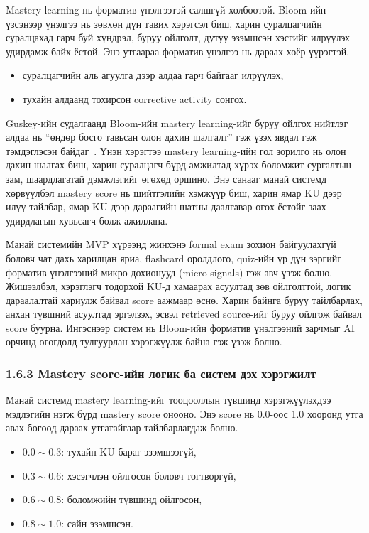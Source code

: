 \documentclass[12pt,A4]{report}
\newcommand{\eng}[1]{#1}
\begin{document}
Mastery learning нь форматив үнэлгээтэй салшгүй холбоотой. Bloom-ийн үзсэнээр үнэлгээ нь зөвхөн дүн тавих хэрэгсэл биш, харин суралцагчийн суралцахад гарч буй хүндрэл, буруу ойлголт, дутуу эзэмшсэн хэсгийг илрүүлэх удирдамж байх ёстой. Энэ утгаараа форматив үнэлгээ нь дараах хоёр үүрэгтэй.

\begin{itemize}
    \item суралцагчийн аль агуулга дээр алдаа гарч байгааг илрүүлэх,
    \item тухайн алдаанд тохирсон corrective activity сонгох.
\end{itemize}

Guskey-ийн судалгаанд Bloom-ийн mastery learning-ийг буруу ойлгох нийтлэг алдаа нь ``өндөр босго тавьсан олон дахин шалгалт'' гэж үзэх явдал гэж тэмдэглэсэн байдаг~\cite{guskey2007}. Үнэн хэрэгтээ mastery learning-ийн гол зорилго нь олон дахин шалгах биш, харин суралцагч бүрд амжилтад хүрэх боломжит сургалтын зам, шаардлагатай дэмжлэгийг өгөхөд оршино. Энэ санааг манай системд хөрвүүлбэл mastery score нь шийтгэлийн хэмжүүр биш, харин ямар KU дээр илүү тайлбар, ямар KU дээр дараагийн шатны даалгавар өгөх ёстойг заах удирдлагын хувьсагч болж ажиллана.

Манай системийн MVP хүрээнд жинхэнэ formal exam зохион байгуулахгүй боловч чат дахь харилцан яриа, flashcard оролдлого, quiz-ийн үр дүн зэргийг форматив үнэлгээний микро дохионууд (\eng{micro-signals}) гэж авч үзэж болно. Жишээлбэл, хэрэглэгч тодорхой KU-д хамаарах асуултад зөв ойлголттой, логик дараалалтай хариулж байвал score аажмаар өснө. Харин байнга буруу тайлбарлах, анхан түвшний асуултад эргэлзэх, эсвэл retrieved source-ийг буруу ойлгож байвал score буурна. Ингэснээр систем нь Bloom-ийн форматив үнэлгээний зарчмыг AI орчинд өгөгдөлд тулгуурлан хэрэгжүүлж байна гэж үзэж болно.

\subsubsection{1.6.3 Mastery score-ийн логик ба систем дэх хэрэгжилт}

Манай системд mastery learning-ийг тооцооллын түвшинд хэрэгжүүлэхдээ мэдлэгийн нэгж бүрд mastery score онооно. Энэ score нь 0.0-оос 1.0 хооронд утга авах бөгөөд дараах утгатайгаар тайлбарлагдаж болно.

\begin{itemize}
    \item $0.0 \sim 0.3$: тухайн KU бараг эзэмшээгүй,
    \item $0.3 \sim 0.6$: хэсэгчлэн ойлгосон боловч тогтворгүй,
    \item $0.6 \sim 0.8$: боломжийн түвшинд ойлгосон,
    \item $0.8 \sim 1.0$: сайн эзэмшсэн.
\end{itemize}
\end{document}
